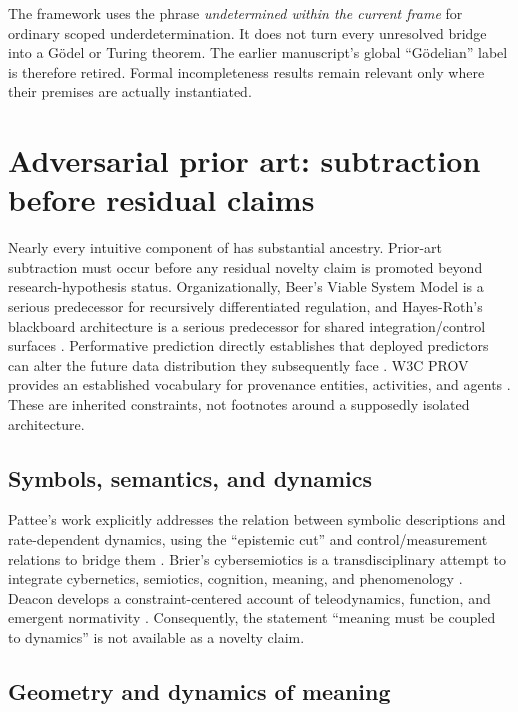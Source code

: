 The framework uses the phrase \emph{undetermined within the current frame} for ordinary scoped underdetermination. It does not turn every unresolved bridge into a Gödel or Turing theorem. The earlier manuscript's global ``Gödelian'' label is therefore retired. Formal incompleteness results remain relevant only where their premises are actually instantiated.

\section{Adversarial prior art: subtraction before residual claims}
\label{sec:prior-art}

Nearly every intuitive component of \CBRD has substantial ancestry. Prior-art subtraction must occur before any residual novelty claim is promoted beyond research-hypothesis status. Organizationally, Beer's Viable System Model is a serious predecessor for recursively differentiated regulation, and Hayes-Roth's blackboard architecture is a serious predecessor for shared integration/control surfaces \citep{Beer1984VSM,HayesRoth1985}. Performative prediction directly establishes that deployed predictors can alter the future data distribution they subsequently face \citep{PerdomoEtAl2020}. W3C PROV provides an established vocabulary for provenance entities, activities, and agents \citep{W3CProvDM2013}. These are inherited constraints, not footnotes around a supposedly isolated architecture.

\subsection{Symbols, semantics, and dynamics}

Pattee's work explicitly addresses the relation between symbolic descriptions and rate-dependent dynamics, using the ``epistemic cut'' and control/measurement relations to bridge them \citep{Pattee2001}. Brier's cybersemiotics is a transdisciplinary attempt to integrate cybernetics, semiotics, cognition, meaning, and phenomenology \citep{Brier2008}. Deacon develops a constraint-centered account of teleodynamics, function, and emergent normativity \citep{Deacon2011,GarciaDeacon2024}. Consequently, the statement ``meaning must be coupled to dynamics'' is not available as a novelty claim.

\subsection{Geometry and dynamics of meaning}

